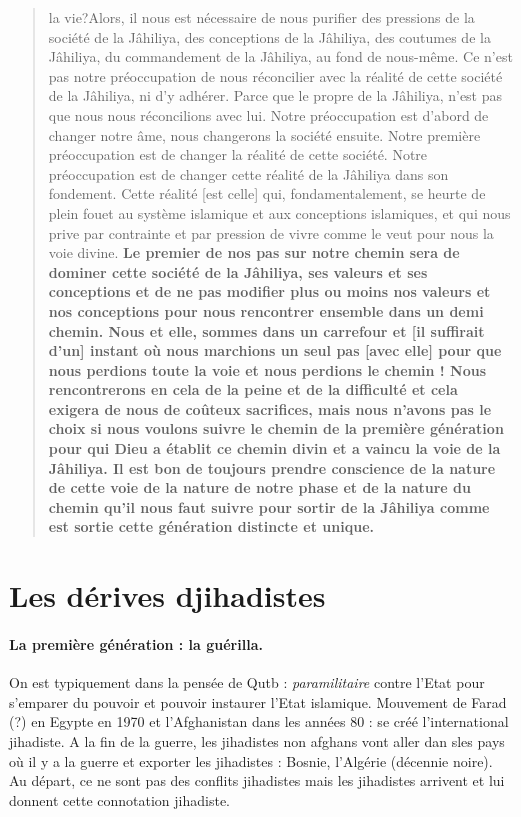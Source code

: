 \begin{quote}
la vie?Alors, il nous est nécessaire de nous purifier des pressions de
la société de la Jâhiliya, des conceptions de la Jâhiliya, des coutumes
de la Jâhiliya, du commandement de la Jâhiliya, au fond de nous-même. Ce
n'est pas notre préoccupation de nous réconcilier avec la réalité de
cette société de la Jâhiliya, ni d'y adhérer. Parce que le propre de la
Jâhiliya, n'est pas que nous nous réconcilions avec lui. Notre
préoccupation est d'abord de changer notre âme, nous changerons la
société ensuite. Notre première préoccupation est de changer la réalité
de cette société. Notre préoccupation est de changer cette réalité de la
Jâhiliya dans son fondement. Cette réalité {[}est celle{]} qui,
fondamentalement, se heurte de plein fouet au système islamique et aux
conceptions islamiques, et qui nous prive par contrainte et par pression
de vivre comme le veut pour nous la voie divine. \textbf{Le premier de
nos pas sur notre chemin sera de dominer cette société de la Jâhiliya,
ses valeurs et ses conceptions et de ne pas modifier plus ou moins nos
valeurs et nos conceptions pour nous rencontrer ensemble dans un demi
chemin. Nous et elle, sommes dans un carrefour et {[}il suffirait
d'un{]} instant où nous marchions un seul pas {[}avec elle{]} pour que
nous perdions toute la voie et nous perdions le chemin ! Nous
rencontrerons en cela de la peine et de la difficulté et cela exigera de
nous de coûteux sacrifices, mais nous n'avons pas le choix si nous
voulons suivre le chemin de la première génération pour qui Dieu a
établit ce chemin divin et a vaincu la voie de la Jâhiliya. Il est bon
de toujours prendre conscience de la nature de cette voie de la nature
de notre phase et de la nature du chemin qu'il nous faut suivre pour
sortir de la Jâhiliya comme est sortie cette génération distincte et
unique.} 
\end{quote}






  \section{{Les dérives  djihadistes}} 
 

   \paragraph{La première génération : la guérilla.} On est typiquement dans la pensée de Qutb : \textit{paramilitaire} contre l'Etat pour s'emparer du pouvoir et pouvoir instaurer l'Etat islamique. Mouvement de Farad (?) en Egypte en 1970 et l'Afghanistan dans les années 80 : se créé l'international jihadiste. A la fin de la guerre, les jihadistes non afghans vont aller dan sles pays où il y a la guerre et exporter les jihadistes : Bosnie, l'Algérie (décennie noire). Au départ, ce ne sont pas des conflits jihadistes mais les jihadistes arrivent et lui donnent cette connotation jihadiste. 
    
